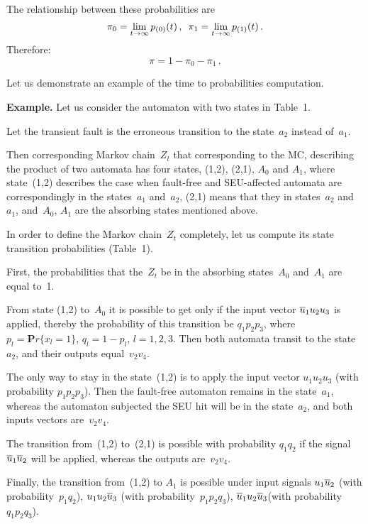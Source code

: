 \begin{multicols}{2}
The relationship between these probabilities are
$$
\pi_0 =
\lim_{t\to\infty} p_{(0)}(t)\,,
\enskip
\pi_1 =
\lim_{t\to\infty} p_{(1)}(t)\,.
$$
Therefore:
\begin{equation}
\pi=1-\pi_0-\pi_1\,.          
\label{e3fr}
\end{equation}

Let us demonstrate an example of the time to probabilities
computation.

\medskip

\noindent
\textbf{Example.}
Let us consider the automaton with two states in Table~1.

Let the transient fault is the erroneous transition to the
state~$a_2$ instead of~$a_1$.

Then corresponding Markov chain~$Z_t$ that corresponding
to the MC, describing the product of two automata has
four states, (1,2), (2,1), $A_0$ and $A_1$, where  state~(1,2)
describes the case when fault-free and SEU-affected
automata are correspondingly in the states~$a_1$ and~$a_2$,
(2,1)  means that they  in states~$a_2$ and~$a_1$, and~$A_0$, 
$A_1$ are the  absorbing states mentioned above.

In order to define the Markov chain~$Z_t$ completely,
let us compute its state transition probabilities
(Table~1).

First, the probabilities that the~$Z_t$ be in the
absorbing states~$A_0$ and~$A_1$ are equal to~1.

From state (1,2) to~$A_0$ it is possible to get only
if the input vector $\overline u_1u_2u_3$ is applied,
thereby the probability of this transition be
$q_1p_2p_3$,
where $p_l={\mathbf Pr}\{x_l =1\}$, $q_l=1-p_l$,
$l=1,2,3$.
Then both automata transit to the state~$a_2$, and
their outputs equal~$v_2v_4$.

The only way to stay in the state~(1,2) is to apply
the input vector $u_1u_2u_3$ (with probability
$p_1p_2p_3$).
Then the fault-free automaton remains in the state~$a_1$,
whereas the automaton subjected the SEU hit will be
in the state~$a_2$, and both inputs vectors are~$v_2v_4$.

The transition from~(1,2) to~(2,1) is possible with
probability $q_1q_2$ if the signal $\overline u_1\overline u_2$ will
be applied, whereas the outputs are~$v_2v_4$.

Finally, the transition from~(1,2) to $A_1$ is possible
under input signals $u_1\overline u_2$ (with probability~$p_1q_2$),
$u_1u_2\overline u_3$ (with probability~$p_1p_2q_3$),
$\overline u_1u_2\overline u_3$(with probability~$q_1p_2q_3$).


\end{multicols}
